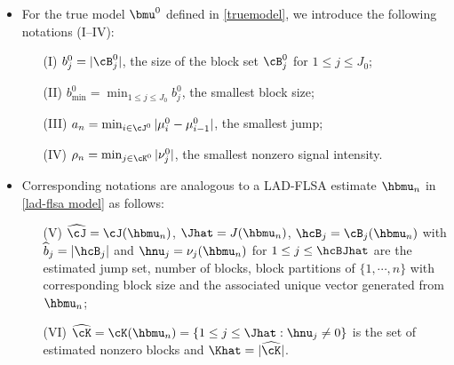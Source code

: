 \documentclass[12pt]{article}
\begin{document}
\begin{itemize}
\item For the true model $\bmu^0$ defined  in \eqref{truemodel}, we introduce the following notations (I--IV):
 \begin{itemize}
 \item [(I)]  $b_j^0=|\cB_j^0|$, the size of the block set $\cB_j^0$ for $1\le j\le J_0$;
  \item [(II)]  $b^0_{\min}=\min_{1\le j\le J_0} b_j^0$, the smallest block size;
  \item [(III)]  $a_n=\min_{i\in \cJ^0} |\mu_i^0-\mu_{i-1}^0|$, the smallest jump;
  \item [(IV)]  $\rho_n=\min_{j\in\cK^0} |\nu_j^0|$, the smallest nonzero signal intensity.
  \end{itemize}
\item  Corresponding notations are analogous to  a LAD-FLSA estimate $\hbmu_n$  in
    \eqref{lad-flsa model} as follows:
  \begin{itemize}
    \item [(V)]  $\widehat \cJ=\cJ(\hbmu_n)$, $\Jhat=J(\hbmu_n)$, $ \hcB_j=\cB_j(\hbmu_n)$
      with $\widehat b_j=|\hcB_j|$  and
  $\hnu_j=\nu_j(\hbmu_n)$ for $1\le j\le \hcBJhat$ are the estimated jump set, number of blocks,
   block partitions of $\{1,\cdots, n\}$  with corresponding block size  and the associated unique
  vector generated
    from  $\hbmu_n$;
      \item [(VI)]  $\widehat{\cK}=\cK(\hbmu_n)=\{1\le j\le \Jhat: \hnu_j\neq 0\}$ is the set of estimated nonzero blocks
   and $\Khat=|\widehat{\cK}|$.
     \end{itemize}
 \end{itemize}
\end{document}

